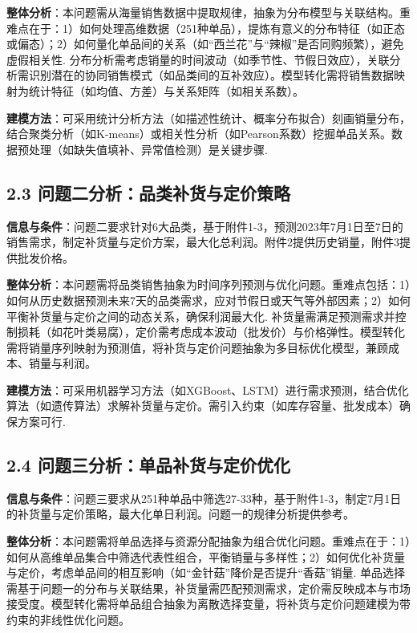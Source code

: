 \documentclass{cumcmthesis} %
\begin{document}
\textbf{整体分析}：本问题需从海量销售数据中提取规律，抽象为分布模型与关联结构。重难点在于：1）如何处理高维数据（251种单品），提炼有意义的分布特征（如正态或偏态）；2）如何量化单品间的关系（如“西兰花”与“辣椒”是否同购频繁），避免虚假相关性\cite{montgomery2010applied}. 分布分析需考虑销量的时间波动（如季节性、节假日效应），关联分析需识别潜在的协同销售模式（如品类间的互补效应）。模型转化需将销售数据映射为统计特征（如均值、方差）与关系矩阵（如相关系数）。

\textbf{建模方法}：可采用统计分析方法（如描述性统计、概率分布拟合）刻画销量分布，结合聚类分析（如K-means）或相关性分析（如Pearson系数）挖掘单品关系。数据预处理（如缺失值填补、异常值检测）是关键步骤\cite{hair2019multivariate}.

\subsection*{2.3 问题二分析：品类补货与定价策略}

\textbf{信息与条件}：问题二要求针对6大品类，基于附件1-3，预测2023年7月1日至7日的销售需求，制定补货量与定价方案，最大化总利润。附件2提供历史销量，附件3提供批发价格。

\textbf{整体分析}：本问题需将品类销售抽象为时间序列预测与优化问题。重难点包括：1）如何从历史数据预测未来7天的品类需求，应对节假日或天气等外部因素；2）如何平衡补货量与定价之间的动态关系，确保利润最大化\cite{3}. 补货量需满足预测需求并控制损耗（如花叶类易腐），定价需考虑成本波动（批发价）与价格弹性。模型转化需将销量序列映射为预测值，将补货与定价问题抽象为多目标优化模型，兼顾成本、销量与利润。

\textbf{建模方法}：可采用机器学习方法（如XGBoost、LSTM）进行需求预测，结合优化算法（如遗传算法）求解补货量与定价。需引入约束（如库存容量、批发成本）确保方案可行\cite{Chopra2007}.

\subsection*{2.4 问题三分析：单品补货与定价优化}

\textbf{信息与条件}：问题三要求从251种单品中筛选27-33种，基于附件1-3，制定7月1日的补货量与定价策略，最大化单日利润。问题一的规律分析提供参考。

\textbf{整体分析}：本问题需将单品选择与资源分配抽象为组合优化问题。重难点在于：1）如何从高维单品集合中筛选代表性组合，平衡销量与多样性；2）如何优化补货量与定价，考虑单品间的相互影响（如“金针菇”降价是否提升“香菇”销量\cite{talluri2006theory}. 单品选择需基于问题一的分布与关联结果，补货量需匹配预测需求，定价需反映成本与市场接受度。模型转化需将单品组合抽象为离散选择变量，将补货与定价问题建模为带约束的非线性优化问题。
\end{document}
